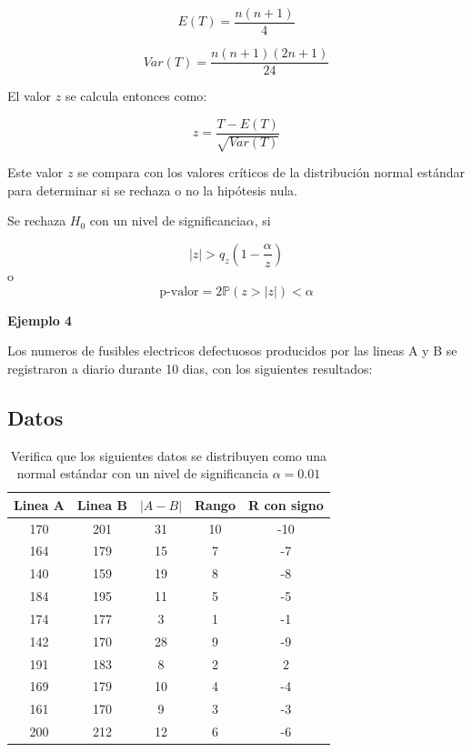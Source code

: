 \documentclass{article}
\begin{document}
\[
    E(T) = \frac{n(n + 1)}{4}
\]

\[
    Var(T) = \frac{n(n + 1)(2n + 1)}{24}
\]

El valor $z$ se calcula entonces como:

\[
    z = \frac{T - E(T)}{\sqrt{Var(T)}}
\]

Este valor $z$ se compara con los valores críticos de la distribución normal estándar para determinar si se rechaza o no la hipótesis nula.


Se rechaza $H_0$ con un nivel de significancia$\alpha$, si

\[|z| > q_z(1-\frac{\alpha}{z})\]
o
\[\text{p-valor} = 2\mathbb{P}(z > |z|) < \alpha\]

\textbf{Ejemplo 4}

Los numeros de fusibles electricos defectuosos producidos por las lineas A y B se registraron a diario durante 10 dias, con los siguientes resultados:

\subsection*{Datos}

\begin{table}[ht]
    \centering
    \caption{Verifica que los siguientes datos se distribuyen como una normal estándar con un nivel de significancia $\alpha=0.01$}
    \begin{tabular}{ccccc}
        \toprule
        Linea A & Linea B & $| A - B|$ & Rango & R con signo \\
        \midrule
        170     & 201     & 31         & 10    & -10         \\
        164     & 179     & 15         & 7     & -7          \\
        140     & 159     & 19         & 8     & -8          \\
        184     & 195     & 11         & 5     & -5          \\
        174     & 177     & 3          & 1     & -1          \\
        142     & 170     & 28         & 9     & -9          \\
        191     & 183     & 8          & 2     & 2           \\
        169     & 179     & 10         & 4     & -4          \\
        161     & 170     & 9          & 3     & -3          \\
        200     & 212     & 12         & 6     & -6          \\
        \bottomrule
    \end{tabular}
\end{table}
\end{document}
